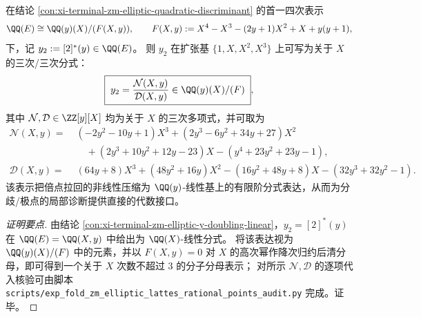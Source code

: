 \begin{conclusion}\label{con:xi-terminal-zm-elliptic-y-doubling-cubic-fraction}
在结论 \ref{con:xi-terminal-zm-elliptic-quadratic-discriminant} 的首一四次表示
\[
\QQ(E)\cong \QQ(y)(X)/(F(X,y)),
\qquad
F(X,y):=X^{4}-X^{3}-(2y+1)X^{2}+X+y(y+1),
\]
下，记 \(y_2:=[2]^*(y)\in\QQ(E)\)。
则 \(y_2\) 在扩张基 \(\{1,X,X^{2},X^{3}\}\) 上可写为关于 \(X\) 的三次/三次分式：
\[
\boxed{\;
y_2=\frac{\mathcal N(X,y)}{\mathcal D(X,y)}\in \QQ(y)(X)/(F)\;},
\]
其中 \(\mathcal N,\mathcal D\in\ZZ[y][X]\) 均为关于 \(X\) 的三次多项式，并可取为
\[
\begin{aligned}
\mathcal N(X,y)=\;&(-2y^{2}-10y+1)X^{3}+(2y^{3}-6y^{2}+34y+27)X^{2}\\
&\quad+(2y^{3}+10y^{2}+12y-23)X-(y^{4}+23y^{2}+23y-1),\\[1mm]
\mathcal D(X,y)=\;&(64y+8)X^{3}+(48y^{2}+16y)X^{2}-(16y^{2}+48y+8)X-(32y^{3}+32y^{2}-1).
\end{aligned}
\]
该表示把倍点拉回的非线性压缩为 \(\QQ(y)\)-线性基上的有限阶分式表达，从而为分歧/极点的局部诊断提供直接的代数接口。
\end{conclusion}
\begin{proof}[证明要点]
由结论 \ref{con:xi-terminal-zm-elliptic-y-doubling-linear}，\(y_2=[2]^*(y)\) 在 \(\QQ(E)=\QQ(X,y)\) 中给出为 \(\QQ(X)\)-线性分式。
将该表达视为 \(\QQ(y)(X)/(F)\) 中的元素，并以 \(F(X,y)=0\) 对 \(X\) 的高次幂作降次归约后清分母，即可得到一个关于 \(X\) 次数不超过 \(3\) 的分子分母表示；
对所示 \(\mathcal N,\mathcal D\) 的逐项代入核验可由脚本 \texttt{scripts/exp\_fold\_zm\_elliptic\_lattes\_rational\_points\_audit.py} 完成。证毕。
\end{proof}

